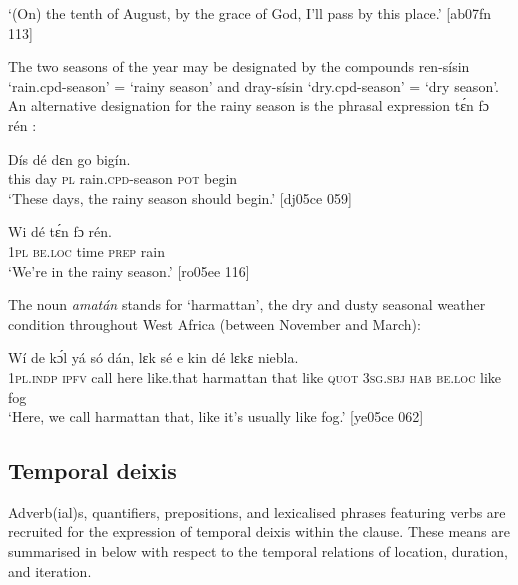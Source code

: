 \glt ‘(On) the tenth of August, by the grace of God, I’ll pass by this place.’ [ab07fn 113]
\z

The two seasons of the year may be designated by the compounds{\fff} ren-sísin ‘rain.cpd-season’ = ‘rainy season’  and dray-sísin ‘dry.cpd-season’ = ‘dry season’. An alternative designation for the rainy season is the phrasal expression tɛ́n fɔ rén : 


\ea%
    \label{ex:key:1005}
    \gll Dís  dé  dɛn      go  bigín.\\
this  day  \textsc{pl}  rain.\textsc{cpd}{}-season  \textsc{pot}  begin\\

\glt ‘These days, the rainy season should begin.’ [dj05ce 059]
\z


\ea%
    \label{ex:key:1006}
    \gll Wi  dé    tɛ́n    fɔ  rén.\\
\textsc{1pl}  \textsc{be.loc}  time    \textsc{prep}  rain\\

\glt ‘We’re in the rainy season.’ [ro05ee 116]
\z

The noun \textit{amatán} stands for ‘harmattan’, the dry and dusty seasonal weather condition throughout West Africa (between November and March): 


\ea%
    \label{ex:key:1007}
    \gll Wí    de  kɔ́l  yá    só        dán,    lɛk  sé 
e    kin  dé    lɛkɛ  niebla.\\
\textsc{1pl.indp}  \textsc{ipfv}  call  here    like.that  harmattan  that    like  \textsc{quot}
\textsc{3sg.sbj}  \textsc{hab}  \textsc{be.loc}  like  fog\\

\glt ‘Here, we call harmattan that, like it’s usually like fog.’ [ye05ce 062]
\z

\subsection{Temporal deixis}\label{sec:8.2.2}

Adverb(ial)s, quantifiers, prepositions, and lexicalised phrases featuring verbs are recruited for the expression of temporal deixis within the clause. These means are summarised in  below with respect to the temporal relations of location, duration, and iteration. 


